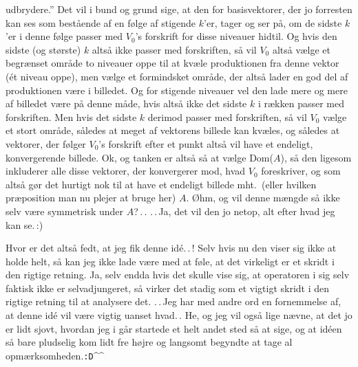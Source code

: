 \documentclass{report}
\begin{document}
udbrydere.'' Det vil i bund og grund sige, at den for basisvektorer, der jo forresten kan ses som bestående af en følge af stigende $k$'er, tager og ser på, om de sidste $k$'er i denne følge passer med $V_0$'s forskrift for disse niveauer hidtil. Og hvis den sidste (og største) $k$ altså ikke passer med forskriften, så vil $V_0$ altså vælge et begrænset område to niveauer oppe til at kvæle produktionen fra denne vektor (ét niveau oppe), men vælge et formindsket område, der altså lader en god del af produktionen være i billedet. Og for stigende niveauer vel den lade mere og mere af billedet være på denne måde, hvis altså ikke det sidste $k$ i rækken passer med forskriften. Men hvis det sidste $k$ derimod passer med forskriften, så vil $V_0$ vælge et stort område, således at meget af vektorens billede kan kvæles, og således at vektorer, der følger $V_0$'s forskrift efter et punkt altså vil have et endeligt, konvergerende billede. Ok, og tanken er altså så at vælge Dom($A$), så den ligesom inkluderer alle disse vektorer, der konvergerer mod, hvad $V_0$ foreskriver, og som altså gør det hurtigt nok til at have et endeligt billede mht.\ (eller hvilken præposition man nu plejer at bruge her) $A$. Øhm, og vil denne mængde så ikke selv være symmetrisk under $A$?\,.\,. .\,.\,Ja, det vil den jo netop, alt efter hvad jeg kan se.\,:) 

Hvor er det altså fedt, at jeg fik denne idé.\,.\,! Selv hvis nu den viser sig ikke at holde helt, så kan jeg ikke lade være med at føle, at det virkeligt er et skridt i den rigtige retning. Ja, selv endda hvis det skulle vise sig, at operatoren i sig selv faktisk ikke er selvadjungeret, så virker det stadig som et vigtigt skridt i den rigtige retning til at analysere det. .\,.\,Jeg har med andre ord en fornemmelse af, at denne idé vil være vigtig uanset hvad.\,. He, og jeg vil også lige nævne, at det jo er lidt sjovt, hvordan jeg i går startede et helt andet sted så at sige, og at idéen så bare pludselig kom lidt fre højre og langsomt begyndte at tage al opmærksomheden.\texttt{:D}\textasciicircum\textasciicircum\ 
\end{document}
